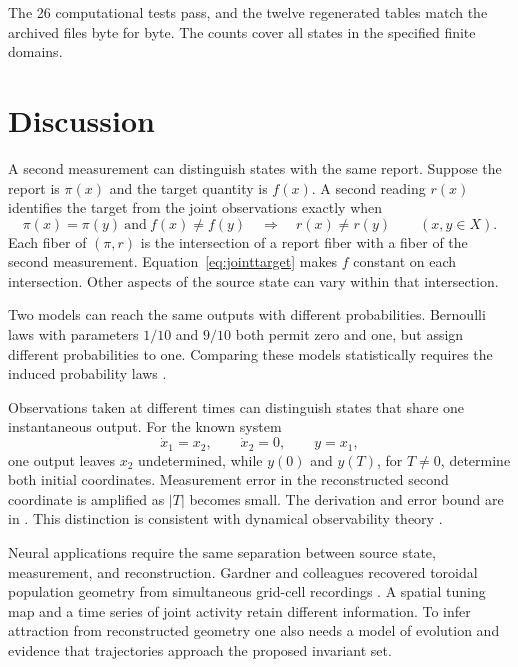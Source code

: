 The 26 computational tests pass, and the twelve regenerated tables match the archived files byte for byte. The counts cover all states in the specified finite domains.

\section{Discussion}
\label{sec:maindiscussion}
A second measurement can distinguish states with the same report. Suppose the report is \(\pi(x)\) and the target quantity is \(f(x)\). A second reading \(r(x)\) identifies the target from the joint observations exactly when
\begin{equation}
\pi(x)=\pi(y)\ \text{and}\ f(x)\ne f(y)
\quad\Longrightarrow\quad r(x)\ne r(y)
\qquad (x,y\in X).
\label{eq:jointtarget}
\end{equation}
Each fiber of \((\pi,r)\) is the intersection of a report fiber with a fiber of the second measurement. Equation~\eqref{eq:jointtarget} makes \(f\) constant on each intersection. Other aspects of the source state can vary within that intersection.

Two models can reach the same outputs with different probabilities. Bernoulli laws with parameters \(1/10\) and \(9/10\) both permit zero and one, but assign different probabilities to one. Comparing these models statistically requires the induced probability laws \parencite{Rothenberg1971}.

Observations taken at different times can distinguish states that share one instantaneous output. For the known system
\begin{equation}
\dot x_1=x_2,\qquad\dot x_2=0,\qquad y=x_1,
\end{equation}
one output leaves \(x_2\) undetermined, while \(y(0)\) and \(y(T)\), for \(T\neq0\), determine both initial coordinates. Measurement error in the reconstructed second coordinate is amplified as \(|T|\) becomes small. The derivation and error bound are in . This distinction is consistent with dynamical observability theory \parencite{HermannKrener1977}.

Neural applications require the same separation between source state, measurement, and reconstruction. Gardner and colleagues recovered toroidal population geometry from simultaneous grid-cell recordings \parencite{Gardner2022}. A spatial tuning map and a time series of joint activity retain different information. To infer attraction from reconstructed geometry one also needs a model of evolution and evidence that trajectories approach the proposed invariant set.

